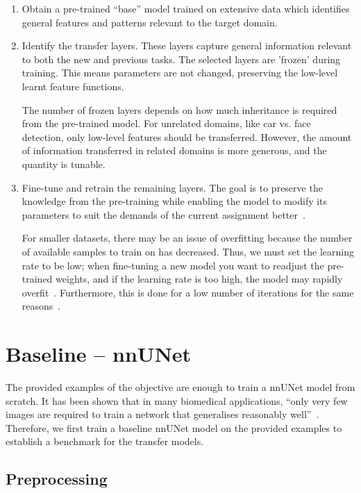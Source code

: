 \documentclass[11pt,twoside]{report}
\begin{document}
\begin{enumerate}
  \item Obtain a pre-trained ``base'' model trained on extensive data which identifies general features and patterns relevant to the target domain.
  
  \item Identify the transfer layers. These layers capture general information relevant to both the new and previous tasks. The selected layers are 'frozen' during training. This means parameters are not changed, preserving the low-level learnt feature functions. 
  
  The number of frozen layers depends on how much inheritance is required from the pre-trained model. For unrelated domains, like car vs. face detection, only low-level features should be transferred. However, the amount of information transferred in related domains is more generous, and the quantity is tunable.
  
  \item Fine-tune and retrain the remaining layers. The goal is to preserve the knowledge from the pre-training while enabling the model to modify its parameters to suit the demands of the current assignment better~\cite{geeks-transfer-learning}.
  
  For smaller datasets, there may be an issue of overfitting because the number of available samples to train on has decreased. Thus, we must set the learning rate to be low; when fine-tuning a new model you want to readjust the pre-trained weights, and if the learning rate is too high, the model may rapidly overfit~\cite{geeks-transfer-learning}. Furthermore, this is done for a low number of iterations for the same reasons~\cite{deep-learning-book}.
\end{enumerate}

\section{Baseline -- nnUNet}

The provided examples of the objective are enough to train a nnUNet model from scratch. It has been shown that in many biomedical applications, ``only very few images are required to train a network that generalises reasonably well''~\cite{DBLP:journals/corr/CicekALBR16}. Therefore, we first train a baseline nnUNet model on the provided examples to establish a benchmark for the transfer models.

\subsection{Preprocessing}\label{sec:nnunet-preprocessing}
\end{document}
